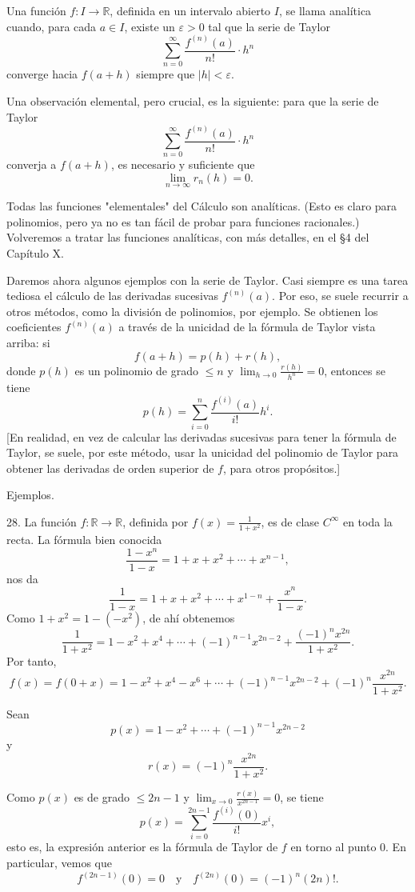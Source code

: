 \documentclass[12pt,oneside]{book}
\begin{document}
Una función \( f: I \to \mathbb{R} \), definida en un intervalo abierto \( I \), se llama analítica cuando, para cada \( a \in I \), existe un \( \varepsilon > 0 \) tal que la serie de Taylor
\[
\sum_{n=0}^{\infty} \frac{f^{(n)}(a)}{n!} \cdot h^n
\]
converge hacia \( f(a + h) \) siempre que \( |h| < \varepsilon \).

Una observación elemental, pero crucial, es la siguiente: para que la serie de Taylor
\[
\sum_{n=0}^{\infty} \frac{f^{(n)}(a)}{n!} \cdot h^n
\]
converja a \( f(a+h) \), es necesario y suficiente que
\[
\lim_{n \to \infty} r_n(h) = 0.
\]

Todas las funciones "elementales" del Cálculo son analíticas. (Esto es claro para polinomios, pero ya no es tan fácil de probar para funciones racionales.) Volveremos a tratar las funciones analíticas, con más detalles, en el §4 del Capítulo X.

Daremos ahora algunos ejemplos con la serie de Taylor. Casi siempre es una tarea tediosa el cálculo de las derivadas sucesivas \( f^{(n)}(a) \). Por eso, se suele recurrir a otros métodos, como la división de polinomios, por ejemplo. Se obtienen los coeficientes \( f^{(n)}(a) \) a través de la unicidad de la fórmula de Taylor vista arriba: si
\[
f(a+h) = p(h) + r(h),
\]
donde \( p(h) \) es un polinomio de grado \( \leq n \) y \( \lim_{h \to 0} \frac{r(h)}{h^n} = 0 \), entonces se tiene
\[
p(h) = \sum_{i=0}^n \frac{f^{(i)}(a)}{i!}h^i.
\]
[En realidad, en vez de calcular las derivadas sucesivas para tener la fórmula de Taylor, se suele, por este método, usar la unicidad del polinomio de Taylor para obtener las derivadas de orden superior de \( f \), para otros propósitos.]

Ejemplos.

28. La función \( f: \mathbb{R} \to \mathbb{R} \), definida por \( f(x) = \frac{1}{1+x^2} \), es de clase \( C^\infty \) en toda la recta. La fórmula bien conocida
\[
\frac{1-x^n}{1-x} = 1 + x + x^2 + \cdots + x^{n-1},
\]
nos da
\[
\frac{1}{1-x} = 1 + x + x^2 + \cdots + x^{1-n} + \frac{x^n}{1-x}.
\]
Como \( 1+x^2 = 1 - (-x^2) \), de ahí obtenemos
\[
\frac{1}{1+x^2} = 1 - x^2 + x^4 + \cdots + (-1)^{n-1}x^{2n-2} + \frac{(-1)^n x^{2n}}{1+x^2}.
\]
Por tanto,
\[
f(x) = f(0+x) = 1 - x^2 + x^4 - x^6 + \cdots + (-1)^{n-1}x^{2n-2} + (-1)^n \frac{x^{2n}}{1+x^2}.
\]

Sean
\[
p(x) = 1 - x^2 + \cdots + (-1)^{n-1} x^{2n-2}
\]
y
\[
r(x) = (-1)^n \frac{x^{2n}}{1 + x^2}.
\]

Como \( p(x) \) es de grado \( \leq 2n - 1 \) y \( \lim_{x \to 0} \frac{r(x)}{x^{2n-1}} = 0 \), se tiene
\[
p(x) = \sum_{i=0}^{2n-1} \frac{f^{(i)}(0)}{i!} x^i,
\]
esto es, la expresión anterior es la fórmula de Taylor de \( f \) en torno al punto \( 0 \). En particular, vemos que
\[
f^{(2n-1)}(0) = 0 \quad \text{y} \quad f^{(2n)}(0) = (-1)^n (2n)!.
\]
\end{document}
